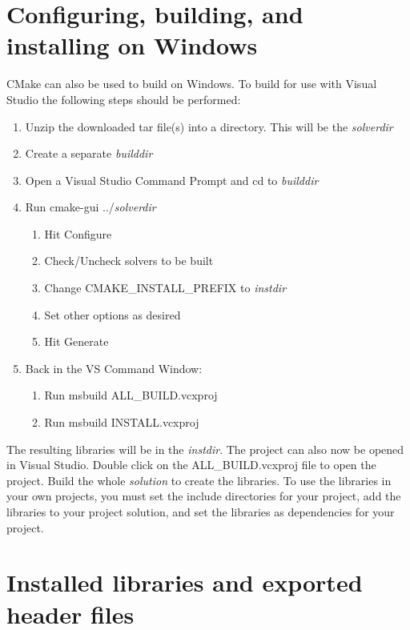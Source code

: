 \section{Configuring, building, and installing  on Windows}\label{s:cmake_windows}
CMake can also be used to build {\sundials} on Windows. To build {\sundials} for
use with Visual Studio the following steps should be performed:
\begin{enumerate}
\item Unzip the downloaded tar file(s) into a directory. This will be the {\em solverdir} 
\item Create a separate {\em builddir}
\item Open a Visual Studio Command Prompt and cd to {\em builddir}
\item Run cmake-gui ../{\em solverdir}
\begin{enumerate}
\item Hit Configure
\item Check/Uncheck solvers to be built
\item Change CMAKE\_INSTALL\_PREFIX to {\em instdir}
\item Set other options as desired
\item Hit Generate
\end{enumerate}
\item Back in the VS Command Window:
\begin{enumerate}
\item Run msbuild ALL\_BUILD.vcxproj
\item Run msbuild INSTALL.vcxproj
\end{enumerate} 
\end{enumerate}

\noindent The resulting libraries will be in the {\em instdir}.
\noindent The {\sundials} project can also now be opened in Visual Studio.
Double click on the ALL\_BUILD.vcxproj file to open the project.
Build the whole {\em solution} to create the {\sundials} libraries.
To use the {\sundials} libraries in your own projects, you must
set the include directories for your project,
add the {\sundials} libraries to your project solution,
and set the {\sundials} libraries as dependencies for your project.

\section{Installed libraries and exported header files}


